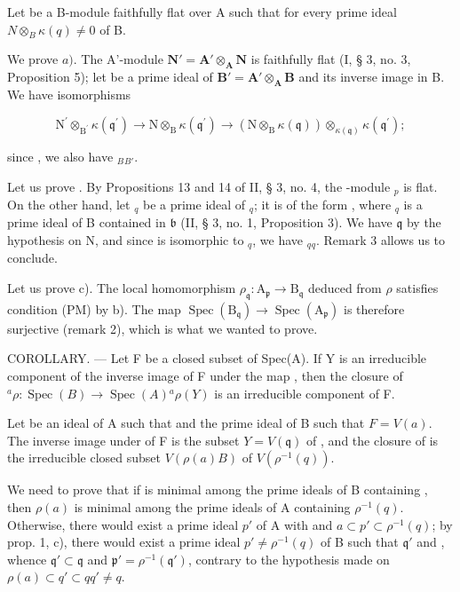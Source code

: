 Let  be a B-module faithfully flat over A such that  for every prime ideal \(N \otimes_{B} \kappa(q) \neq 0\) of B.

We prove \(a)\). The A'-module \(\mathbf{N}' = \mathbf{A}' \otimes_{\mathbf{A}} \mathbf{N}\) is faithfully flat (I, § 3, no. 3, Proposition 5); let  be a prime ideal of \(\mathbf{B}' = \mathbf{A}' \otimes_{\mathbf{A}} \mathbf{B}\) and  its inverse image in B. We have isomorphisms

\[
\mathrm{N} ^ {\prime} \otimes_ {\mathrm{B} ^ {\prime}} \kappa (\mathfrak {q} ^ {\prime}) \rightarrow \mathrm{N} \otimes_ {\mathrm{B}} \kappa (\mathfrak {q} ^ {\prime}) \rightarrow (\mathrm{N} \otimes_ {\mathrm{B}} \kappa (\mathfrak {q})) \otimes_ {\kappa (\mathfrak {q})} \kappa (\mathfrak {q} ^ {\prime});
\]

since , we also have \(_{B}\)\(_{B'}\).

Let us prove . By Propositions 13 and 14 of II, § 3, no. 4, the -module \(_{p}\) is flat. On the other hand, let \(_{q}\) be a prime ideal of \(_{q}\); it is of the form , where \(_{q}\) is a prime ideal of B contained in \(\mathfrak{b}\) (II, § 3, no. 1, Proposition 3). We have \(\mathfrak{q}\) by the hypothesis on N, and since  is isomorphic to \(_{q}\), we have \(_{q}\)\(_{q}\). Remark 3 allows us to conclude.

Let us prove c). The local homomorphism \(\rho_{\mathfrak{q}}: \mathrm{A}_{\mathfrak{p}} \to \mathrm{B}_{\mathfrak{q}}\) deduced from \(\rho\) satisfies condition (PM) by b). The map \(\operatorname{Spec}(\mathrm{B}_{\mathfrak{q}}) \to \operatorname{Spec}(\mathrm{A}_{\mathfrak{p}})\) is therefore surjective (remark 2), which is what we wanted to prove.

COROLLARY. --- Let F be a closed subset of Spec(A). If Y is an irreducible component of the inverse image of F under the map , then the closure of \(^{a}\rho : \operatorname{Spec}(B) \to \operatorname{Spec}(A)\)\(^{a}\rho(Y)\) is an irreducible component of F.

Let  be an ideal of A such that  and  the prime ideal of B such that \(F = V(a)\). The inverse image under  of F is the subset \(Y = V(\mathfrak{q})\) of , and the closure of  is the irreducible closed subset \(V(\rho(a)B)\) of \(V(\rho^{-1}(q))\).

We need to prove that if  is minimal among the prime ideals of B containing , then \(\rho(a)\) is minimal among the prime ideals of A containing \(\rho^{-1}(q)\). Otherwise, there would exist a prime ideal \(p'\) of A with  and \(a \subset p' \subset \rho^{-1}(q)\); by prop. 1, c), there would exist a prime ideal \(p' \neq \rho^{-1}(q)\) of B such that \(\mathfrak{q}'\) and , whence \(\mathfrak{q}' \subset \mathfrak{q}\) and \(\mathfrak{p}' = \rho^{-1}(\mathfrak{q}')\), contrary to the hypothesis made on \(\rho(a) \subset q' \subset q\)\(q' \neq q\).

